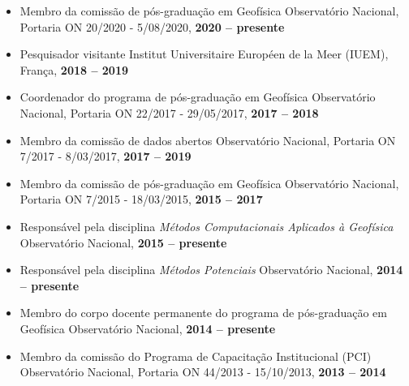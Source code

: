 \begin{itemize}
	\item Membro da comissão de pós-graduação em Geofísica \newline
	Observat\'{o}rio Nacional, Portaria ON 20/2020 - 5/08/2020, \textbf{2020 -- presente}

	\item Pesquisador visitante \newline
	Institut Universitaire Européen de la Meer (IUEM), França, \textbf{2018 -- 2019}

	\item Coordenador do programa de pós-graduação em Geofísica \newline
	Observat\'{o}rio Nacional, Portaria ON 22/2017 - 29/05/2017, \textbf{2017 -- 2018}

	\item Membro da comissão de dados abertos \newline
	Observat\'{o}rio Nacional, Portaria ON 7/2017 - 8/03/2017, \textbf{2017 -- 2019}
	
	\item Membro da comissão de pós-graduação em Geofísica \newline
	Observat\'{o}rio Nacional, Portaria ON 7/2015 - 18/03/2015, \textbf{2015 -- 2017}
	
	\item Responsável pela disciplina \textit{Métodos Computacionais Aplicados à Geofísica}
	\newline
	Observat\'{o}rio Nacional, \textbf{2015 -- presente}
	
	\item Responsável pela disciplina \textit{Métodos Potenciais}
	\newline
	Observat\'{o}rio Nacional, \textbf{2014 -- presente}
	
	\item Membro do corpo docente permanente do programa de pós-graduação em Geofísica
	\newline
	Observat\'{o}rio Nacional, \textbf{2014 -- presente}
	
	\item Membro da comissão do Programa de Capacitação Institucional (PCI) \newline
	Observat\'{o}rio Nacional, Portaria ON 44/2013 - 15/10/2013, \textbf{2013 -- 2014}
	
\end{itemize}